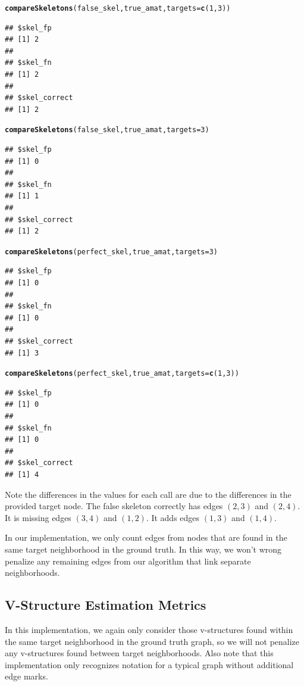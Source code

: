 \documentclass[12pt]{article}\usepackage[]{graphicx}\usepackage[]{xcolor}
\makeatletter
\newcommand{\hlnum}[1]{\textcolor[rgb]{0.686,0.059,0.569}{#1}}%
\newcommand{\hlstd}[1]{\textcolor[rgb]{0.345,0.345,0.345}{#1}}%
\newcommand{\hlkwc}[1]{\textcolor[rgb]{0.333,0.667,0.333}{#1}}%
\newcommand{\hlkwd}[1]{\textcolor[rgb]{0.737,0.353,0.396}{\textbf{#1}}}%
\newenvironment{kframe}{%
 \def\at@end@of@kframe{}%
 \ifinner\ifhmode%
  \def\at@end@of@kframe{\end{minipage}}%
  \begin{minipage}{\columnwidth}%
 \fi\fi%
 \def\FrameCommand##1{\hskip\@totalleftmargin \hskip-\fboxsep
 \colorbox{shadecolor}{##1}\hskip-\fboxsep
     \hskip-\linewidth \hskip-\@totalleftmargin \hskip\columnwidth}%
 \MakeFramed {\advance\hsize-\width
   \@totalleftmargin\z@ \linewidth\hsize
   \@setminipage}}%
 {\par\unskip\endMakeFramed%
 \at@end@of@kframe}
\newenvironment{knitrout}{}{} %
\makeatother
\begin{document}
\begin{knitrout}
\color{fgcolor}\begin{kframe}
\begin{alltt}
\hlkwd{compareSkeletons}\hlstd{(false_skel,true_amat,}\hlkwc{targets} \hlstd{=} \hlkwd{c}\hlstd{(}\hlnum{1}\hlstd{,}\hlnum{3}\hlstd{))}
\end{alltt}
\begin{verbatim}
## $skel_fp
## [1] 2
## 
## $skel_fn
## [1] 2
## 
## $skel_correct
## [1] 2
\end{verbatim}
\begin{alltt}
\hlkwd{compareSkeletons}\hlstd{(false_skel,true_amat,}\hlkwc{targets} \hlstd{=} \hlnum{3}\hlstd{)}
\end{alltt}
\begin{verbatim}
## $skel_fp
## [1] 0
## 
## $skel_fn
## [1] 1
## 
## $skel_correct
## [1] 2
\end{verbatim}
\begin{alltt}
\hlkwd{compareSkeletons}\hlstd{(perfect_skel,true_amat,}\hlkwc{targets} \hlstd{=} \hlnum{3}\hlstd{)}
\end{alltt}
\begin{verbatim}
## $skel_fp
## [1] 0
## 
## $skel_fn
## [1] 0
## 
## $skel_correct
## [1] 3
\end{verbatim}
\begin{alltt}
\hlkwd{compareSkeletons}\hlstd{(perfect_skel,true_amat,}\hlkwc{targets} \hlstd{=} \hlkwd{c}\hlstd{(}\hlnum{1}\hlstd{,}\hlnum{3}\hlstd{))}
\end{alltt}
\begin{verbatim}
## $skel_fp
## [1] 0
## 
## $skel_fn
## [1] 0
## 
## $skel_correct
## [1] 4
\end{verbatim}
\end{kframe}
\end{knitrout}

Note the differences in the values for each call are due to the differences in the provided target node. The false skeleton correctly has edges $(2,3)$ and $(2,4)$. It is missing edges $(3,4)$ and $(1,2)$. It adds edges $(1,3)$ and $(1,4)$.

In our implementation, we only count edges from nodes that are found in the same target neighborhood in the ground truth. In this way, we won't wrong penalize any remaining edges from our algorithm that link separate neighborhoods.

\subsection*{V-Structure Estimation Metrics}
In this implementation, we again only consider those v-structures found within the same target neighborhood in the ground truth graph, so we will not penalize any v-structures found between target neighborhoods. Also note that this implementation only recognizes notation for a typical graph without additional edge marks.\\
\end{document}
